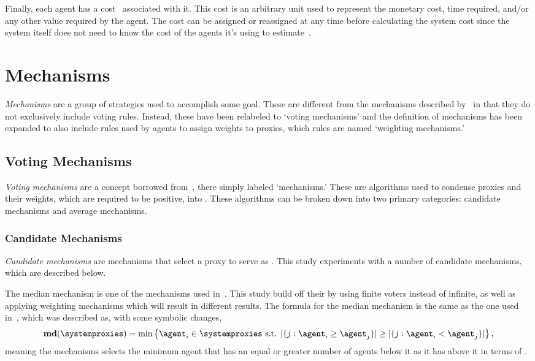 Finally, each agent has a cost \agentcost\ associated with it.
This cost is an arbitrary unit used to represent the monetary cost, time
required, and/or any other value required by the agent.
The cost can be assigned or reassigned at any time before calculating the
system cost since the system itself does not need to know the cost of the
agents it's using to estimate~\truth.



\section{Mechanisms}\label{sec:mechanisms}
\textit{Mechanisms} are a group of strategies used to accomplish some goal.
These are different from the mechanisms described by~\cite{Cohensius2017} in
that they do not exclusively include voting rules.
Instead, these have been relabeled to `voting mechanisms' and the definition
of mechanisms has been expanded to also include rules used by agents to
assign weights to proxies, which rules are named `weighting mechanisms.'

\subsection{Voting Mechanisms}\label{subsec:voting-mechanisms}
\textit{Voting mechanisms} are a concept borrowed from~\cite{Cohensius2017},
there simply labeled `mechanisms.'
These are algorithms used to condense proxies and their weights, which are
required to be positive, into \systemtruth.
These algorithms can be broken down into two primary categories: candidate
mechanisms and average mechanisms.

\subsubsection{Candidate Mechanisms}\label{subsubsec:candidate-mechanisms}
\textit{Candidate mechanisms} are mechanisms that select a proxy to serve as
\systemtruth.
This study experiments with a number of candidate mechanisms, which are
described below.

The median mechanism is one of the mechanisms used in~\cite{Cohensius2017}.
This study build off their by using finite voters instead of infinite, as
well as applying weighting mechanisms which will result in different results.
The formula for the median mechanism is the same as the one used
in~\cite[para.~2.4]{Cohensius2017}, which was described as, with some
symbolic changes,
\begin{equation*}
    \textbf{md}(\systemproxies) =
    \min\left\{\agent_i \in \systemproxies \text{ s.t. }
    |\{j: \agent_i \geq \agent_j\}| \geq
    |\{j: \agent_i < \agent_j\}|
    \right\}
    \text{,}
\end{equation*}
meaning the mechanisms selects the minimum agent that has an equal or greater
number of agents below it as it has above it in terms of \agenttruth.

